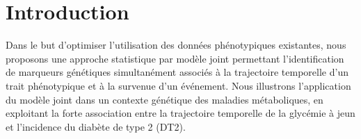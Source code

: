 \documentclass[10pt,a0,portrait]{a0poster}
\begin{document}




\color{SaddleBrown}
\section*{Introduction}
\vspace{-1.5cm}
\par{\large Dans le but d’optimiser l’utilisation des données phénotypiques existantes,
nous proposons une approche statistique par modèle joint permettant l’identification de marqueurs génétiques simultanément associés
à la trajectoire temporelle d’un trait phénotypique et à la survenue d’un événement.
Nous illustrons l’application du modèle joint \citep{tsiatis2004} dans un contexte génétique des maladies métaboliques,
en exploitant la forte association entre la trajectoire temporelle de la glycémie à jeun et l’incidence du diabète de type 2 (DT2).}
\end{document}
